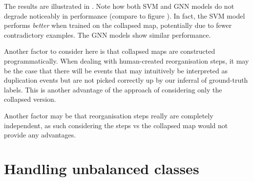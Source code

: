 \documentclass[
	fontsize=10pt, %
	twoside=false, %
	secnumdepth=1, %
]{kaobook}
\begin{document}
The results are illustrated in . Note
how both SVM and GNN models do not degrade noticeably in performance (compare to
figure ). In fact, the SVM model performs \textit{better} when
trained on the collapsed map, potentially due to fewer contradictory examples.
The GNN models show similar performance.


Another factor to consider here is that collapsed maps are constructed
programmatically. When dealing with human-created reorganisation steps, it may
be the case that there will be events that may intuitively be interpreted as
duplication events but are not picked correctly up by our inferral of
ground-truth labels. This is another advantage of the approach of considering
only the collapsed version.

Another factor may be that reorganisation steps really are completely
independent, as such considering the steps vs the collapsed map would not
provide any advantages.









\section{Handling unbalanced classes}
\end{document}
